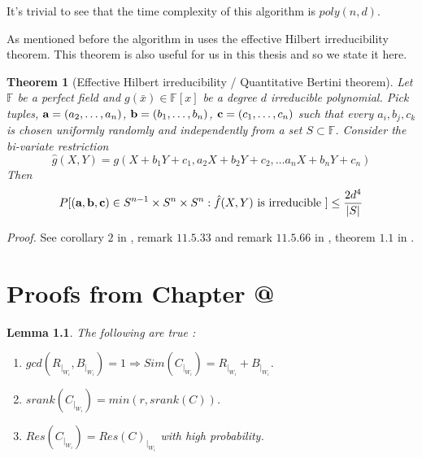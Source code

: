 \documentclass[12pt]{caltech_thesis}
\makeatletter
\theoremstyle{plain}
\newtheorem{theorem}{Theorem}
\newtheorem{lemma}{Lemma}
\theoremstyle{definition}
\renewcommand{\bf}{\textbf}
\newcommand{\F}{\mathbb{F}}
\newcommand{\PP}{\mathbb{P}}
\newcommand{\B}[1]{\bar{#1}}
\newcommand*{\rom}[1]{\expandafter\@slowromancap\romannumeral #1@}
\makeatother
\begin{document}
It's trivial to see that the time complexity of this algorithm is $poly(n,d)$.


As mentioned before the algorithm in \cite{KalTr90} uses the effective Hilbert irreducibility theorem. This theorem is also useful
for us in this thesis and so we state it here.
 
\begin{theorem}[Effective Hilbert irreducibility / Quantitative Bertini theorem]\label{theorem:effectivehilbert}
 Let $\F$ be a perfect field and $g(\B{x})\in \F[x]$ be a degree $d$ irreducible polynomial. Pick tuples, ${\bf a} = (a_2,\ldots, a_n)$,  ${\bf b} = (b_1,\ldots,b_n)$, ${\bf c} = (c_1,\ldots,c_n)$
 such that every $a_i,b_j,c_k$ is chosen uniformly randomly and independently from a set $S\subset \F$.
 Consider the bi-variate restriction
\[
\hat{g}(X,Y) = g(X + b_1Y + c_1, a_2X + b_2Y + c_2, \ldots a_nX + b_n Y + c_n)                                                                                              
\]
Then 
\[
 P[ ({\bf a, \bf  b,\bf  c}) \in S^{n-1}\times S^n \times S^n  :  \hat{f}(X,Y) \text{ is irreducible }] \leq \frac{2d^4}{|S|}
\]
\end{theorem}
\emph{Proof.} See corollary $2$ in \cite{Kal91}, remark $11.5.33$ and remark $11.5.66$ in \cite{MulPa13}, theorem $1.1$ in \cite{KSS14}. 


\chapter{Proofs from Chapter \rom{4}}\label{appendix:proofsfromchap4}
\begin{lemma}\label{lemma:projproof}
The following are true :
\begin{enumerate}
 \item $gcd(R_{|_{W_i}}, B_{|_{W_i}})=1 \Rightarrow Sim(C_{|_{W_i}}) = R_{|_{W_i}} + B_{|_{W_i}}$.
 \item  $srank(C_{|_{W_i}}) = min(r, srank(C))$.
\item $Res(C_{|_{W_i}}) = Res(C)_{|_{W_i}}$ with high probability.
\end{enumerate}
\end{lemma}
\end{document}
